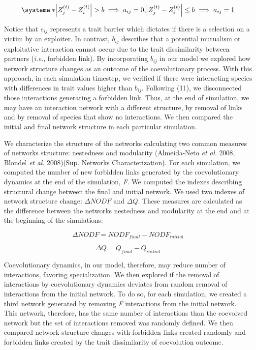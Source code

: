 \documentclass[a4paper, 12pt]{article}
\begin{document}
\begin{equation} \label{eq:11}
  \systeme*{\abs{Z^{(t)}_{j} - Z^{(t)}_{i}} > b \implies a_{ij} = 0,\abs{Z^{(t)}_{j} - Z^{(t)}_{i}} \leq b \implies a_{ij} = 1}
\end{equation}

Notice that $e_{ij}$ represents a trait barrier which dictates if there is a selection on a victim by an exploiter. In contrast, $b_{ij}$ describes that a potential mutualism or exploitative interaction cannot occur due to the trait dissimilarity between partners (\textit{i.e.}, forbidden link). By incorporating $b_{ij}$ in our model we explored how network structure changes as an outcome of the coevolutionary process.  With this approach, in each simulation timestep, we verified if there were interacting species with differences in trait values higher than $b_{ij}$. Following (11), we disconnected those interactions generating a forbidden link. Thus, at the end of simulation,  we may have an interaction network with a different structure, by removal of links and by removal of species that show no interactions. We then compared the initial and final network structure in each particular simulation.

We characterize the structure of the networks calculating two common measures of networks structure: nestedness and modularity (Almeida-Neto \textit{et al.} 2008, Blondel \textit{et al.} 2008)(Sup. Networks Characterization). For each simulation, we computed the number of new forbidden links generated by the coevolutionary dynamics at the end of the simulation, \textit{F}. We computed the indexes describing structural change between the final and initial network. We used two indexes of network structure change: $\Delta NODF$ and $\Delta Q$. These measures are calculated as the difference between the networks nestedness and modularity at the end and at the beginning of the simulations:

\begin{equation} \label{eq:12}
\Delta NODF = NODF_{final} - NODF_{initial}
\end{equation}

\begin{equation} \label{eq:13}
\Delta Q = Q_{final} - Q_{initial}
\end{equation}

Coevolutionary dynamics, in our model, therefore, may reduce number of interactions, favoring specialization. We then explored if the removal of interactions by coevolutionary dynamics deviates from random removal of interactions from the initial network. To do so, for each simulation, we created a third network generated by removing \textit{F}	 interactions from the initial network. This network, therefore, has the same number of interactions than the coevolved network but the set of interactions removed was randomly defined. We then compared network structure changes with forbidden links created randomly and forbidden links created by the trait dissimilarity of coevolution outcome.
\end{document}
